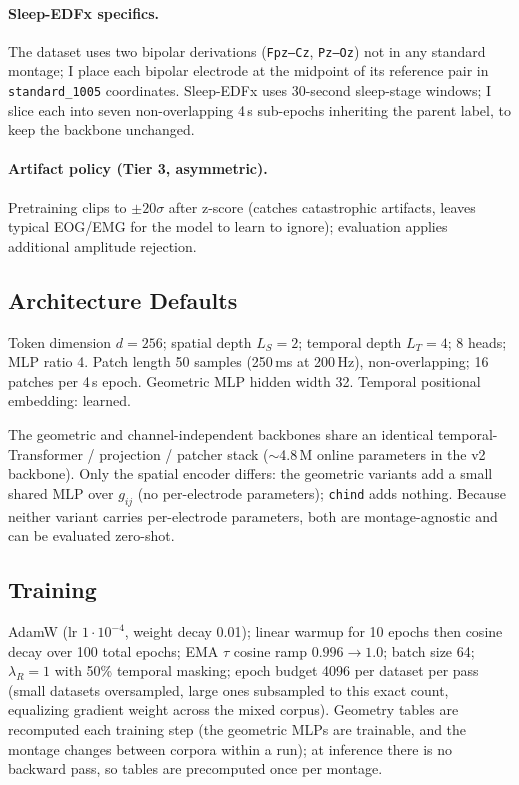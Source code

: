 \documentclass[11pt]{article}
\begin{document}
\paragraph{Sleep-EDFx specifics.}
The dataset uses two bipolar derivations (\texttt{Fpz--Cz},
\texttt{Pz--Oz}) not in any standard montage; I place each bipolar
electrode at the midpoint of its reference pair in \texttt{standard\_1005}
coordinates. Sleep-EDFx uses 30-second sleep-stage windows; I slice each
into seven non-overlapping 4\,s sub-epochs inheriting the parent label, to
keep the backbone unchanged.

\paragraph{Artifact policy (Tier 3, asymmetric).}
Pretraining clips to $\pm 20\sigma$ after z-score (catches catastrophic
artifacts, leaves typical EOG/EMG for the model to learn to ignore);
evaluation applies additional amplitude rejection.

\subsection{Architecture Defaults}
\label{sec:setup:arch}

Token dimension $d = 256$; spatial depth $L_S = 2$; temporal depth
$L_T = 4$; 8 heads; MLP ratio 4. Patch length 50 samples (250\,ms at
200\,Hz), non-overlapping; 16 patches per 4\,s epoch. Geometric MLP hidden
width 32. Temporal positional embedding: learned.

The geometric and channel-independent backbones share an identical
temporal-Transformer / projection / patcher stack ($\sim$4.8\,M online
parameters in the v2 backbone). Only the spatial encoder differs: the
geometric variants add a small shared MLP over $g_{ij}$ (no per-electrode
parameters); \texttt{chind} adds nothing. Because neither variant carries
per-electrode parameters, both are montage-agnostic and can be evaluated
zero-shot.

\subsection{Training}
\label{sec:setup:training}

AdamW (lr $1{\cdot}10^{-4}$, weight decay 0.01); linear warmup for 10 epochs
then cosine decay over 100 total epochs; EMA $\tau$ cosine ramp
$0.996 \to 1.0$; batch size 64; $\lambda_R = 1$ with 50\% temporal masking;
epoch budget 4096 per dataset per pass (small datasets oversampled, large
ones subsampled to this exact count, equalizing gradient weight across the
mixed corpus). Geometry tables are recomputed each training step (the
geometric MLPs are trainable, and the montage changes between corpora within
a run); at inference there is no backward pass, so tables are precomputed
once per montage.
\end{document}
